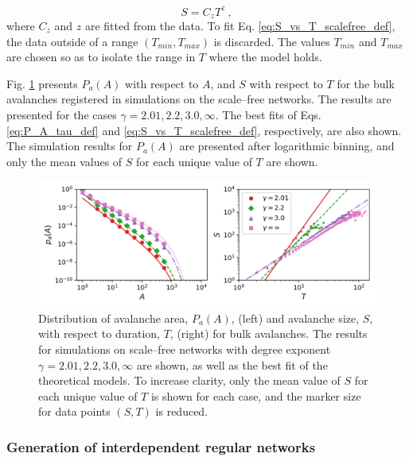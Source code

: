\begin{equation}
	S = C_z T^z \ ,
	\label{eq:S_vs_T_scalefree_def}
\end{equation}
where $C_z$ and $z$ are fitted from the data. To fit Eq. \ref{eq:S_vs_T_scalefree_def}, the data outside of a range $(T_{min}, T_{max})$ is discarded. The values $T_{min}$ and $T_{max}$ are chosen so as to isolate the range in $T$ where the model holds. 

Fig. \ref{fig:SM_scale_free_distributions} presents $P_a(A)$ with respect to $A$, and $S$ with respect to $T$ for the bulk avalanches registered in simulations on the scale--free networks. The results are presented for the cases $\gamma=2.01, 2.2, 3.0, \infty$. The best fits of Eqs. \ref{eq:P_A_tau_def} and \ref{eq:S_vs_T_scalefree_def}, respectively, are also shown. The simulation results for $P_a(A)$ are presented after logarithmic binning, and only the mean values of $S$ for each unique value of $T$ are shown.

\begin{figure}[!h]
	\begin{center}
	\includegraphics[scale=0.75]{./images/task_15/SM_scale_free_distributions.png} 
	\end{center}
	\caption{Distribution of avalanche area, $P_a(A)$, (left) and avalanche size, $S$, with respect to duration, $T$, (right) for bulk avalanches. The results for simulations on scale--free networks with degree exponent $\gamma=2.01,2.2,3.0,\infty$ are shown, as well as the best fit of the theoretical models. To increase clarity, only the mean value of $S$ for each unique value of $T$ is shown for each case, and the marker size for data points $(S,T)$ is reduced. \\} 
	\label{fig:SM_scale_free_distributions} 
\end{figure}


\subsubsection*{Generation of interdependent regular networks}

